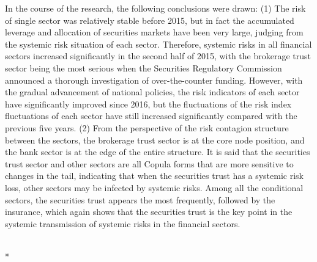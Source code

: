\begin{eabstract}
In the course of the research, the following conclusions were drawn: (1) The risk of single sector was relatively stable before 2015, but in fact the accumulated leverage and allocation of securities markets have been very large, judging from the systemic risk situation of each sector. Therefore, systemic risks in all financial sectors increased significantly in the second half of 2015, with the brokerage trust sector being the most serious when the Securities Regulatory Commission announced a thorough investigation of over-the-counter funding. However, with the gradual advancement of national policies, the risk indicators of each sector have significantly improved since 2016, but the fluctuations of the risk index fluctuations of each sector have still increased significantly compared with the previous five years. (2) From the perspective of the risk contagion structure between the sectors, the brokerage trust sector is at the core node position, and the bank sector is at the edge of the entire structure. It is said that the securities trust sector and other sectors are all Copula forms that are more sensitive to changes in the tail, indicating that when the securities trust has a systemic risk loss, other sectors may be infected by systemic risks. Among all the conditional sectors, the securities trust appears the most frequently, followed by the insurance, which again shows that the securities trust is the key point in the systemic transmission of systemic risks in the financial sectors.

  \\*

\end{eabstract}

